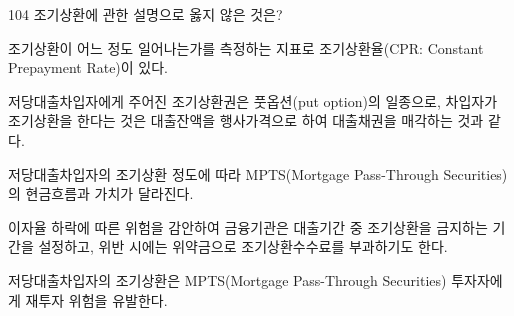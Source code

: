 \begin{question}{104}
조기상환에 관한 설명으로 옳지 않은 것은?
\begin{choices}
  \item 조기상환이 어느 정도 일어나는가를 측정하는 지표로 조기상환율(CPR: Constant Prepayment Rate)이 있다.
  \item 저당대출차입자에게 주어진 조기상환권은 풋옵션(put option)의 일종으로, 차입자가 조기상환을 한다는 것은 대출잔액을 행사가격으로 하여 대출채권을 매각하는 것과 같다.
  \item 저당대출차입자의 조기상환 정도에 따라 MPTS(Mortgage Pass-Through Securities)의 현금흐름과 가치가 달라진다.
  \item 이자율 하락에 따른 위험을 감안하여 금융기관은 대출기간 중 조기상환을 금지하는 기간을 설정하고, 위반 시에는 위약금으로 조기상환수수료를 부과하기도 한다.
  \item 저당대출차입자의 조기상환은 MPTS(Mortgage Pass-Through Securities) 투자자에게 재투자 위험을 유발한다.
\end{choices}
\end{question}
